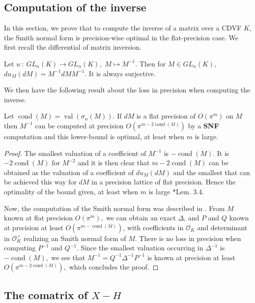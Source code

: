 \documentclass{sig-alternate-05-2015}
\DeclareMathOperator{\val}{val}
\DeclareMathOperator{\cond}{cond}
\newcommand{\OK}{\mathcal{O}_K}
\begin{document}
\subsection{Computation of the inverse}

In this section, we prove that to compute the inverse of
a matrix over a CDVF $K$, the Smith normal form is precision-wise optimal in the flat-precision case.
We first recall the differential of matrix inversion.

\begin{lem}
Let $u \: : \: GL_n (K) \rightarrow GL_n(K),$ $M \mapsto M^{-1}.$
Then for $M \in GL_n (K),$ $du_M(dM)=M^{-1} dM M^{-1}.$
It is always surjective.
\end{lem}

We then have the following result about the loss in precision when computing the inverse.

\begin{prop}
Let $\cond(M) = \val(\sigma_n(M))$.
If $dM$ is a flat precision of $O(\pi^m)$ on $M$ then $M^{-1}$
can be computed at precision $O(\pi^{m-2\cond(M)})$ by a \textbf{SNF} computation
and this lower-bound is optimal,
at least when $m$ is large.
\end{prop}
\begin{proof}
The smallest valuation of a coefficient of $M^{-1}$ is $-\cond(M).$
It is $-2\cond(M)$ for $M^{-2}$ and it is then clear that $m-2\cond(M)$
can be obtained as the valuation of a coefficient of $du_M(dM)$
and the smallest that can be achieved this way for $dM$ in a precision lattice
of flat precision. Hence the optimality of the bound given, at least when 
$m$ is large \cite{caruso-roe-vaccon:14a}*{Lem. 3.4}.

Now, the computation of the Smith normal form was described in \cite{Vaccon-these}.
From $M$ known at flat precision $O(\pi^m),$ we can obtain an exact $\Delta$, and $P$ and $Q$ 
known at precision at least $O(\pi^{m-\cond(M)})$, with coefficients in $\OK$
and determinant in $\OK^\times$ realizing an Smith normal form of $M.$
There is no loss in precision when computing $P^{-1}$ and $Q^{-1}.$
Since the smallest valuation occurring in $\Delta^{-1}$ is $-\cond(M),$
we see that $M^{-1}=Q^{-1} \Delta^{-1} P^{-1}$ is known at precision at least $O(\pi^{m-2\cond(M)}),$
which concludes the proof.
\end{proof}

\subsection{The comatrix of $X{-}H$}
\end{document}

